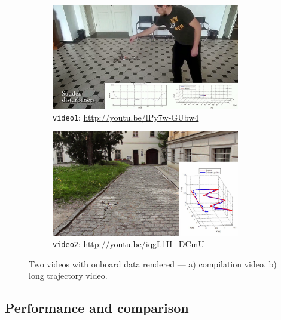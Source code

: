 \begin{figure}[H]
\centering

\begin{subfigure}[b]{0.5\textwidth}
	\centering
	\includegraphics[width=0.9\textwidth]{fig/experiment1_video.jpg}
	\caption{\texttt{video1}: \url{http://youtu.be/lPy7w-GUbw4}}
	\label{fig:video1}
\end{subfigure}%
\begin{subfigure}[b]{0.5\textwidth}
	\centering
	\includegraphics[width=0.9\textwidth]{fig/experiment2_video.jpg}
	\caption{\texttt{video2}: \url{http://youtu.be/iqgL1H_DCmU}}
	\label{fig:video2}
\end{subfigure}

\caption{Two videos with onboard data rendered --- a) compilation video, b) long trajectory video.}
\label{fig:videos}
\end{figure}

\subsection{Performance and comparison}

